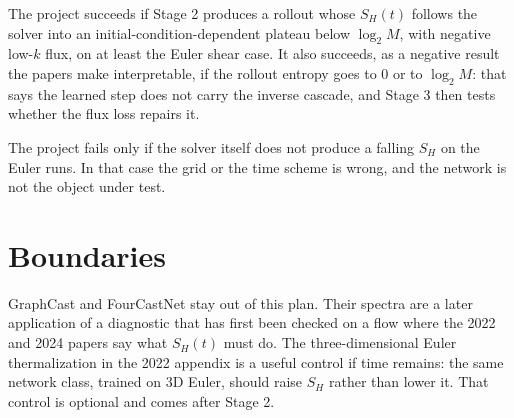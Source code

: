 \documentclass[11pt,a4paper]{article}
\begin{document}
The project succeeds if Stage 2 produces a rollout whose \(S_H(t)\) follows the solver into an initial-condition-dependent plateau below \(\log_2 M\), with negative low-\(k\) flux, on at least the Euler shear case.
It also succeeds, as a negative result the papers make interpretable, if the rollout entropy goes to \(0\) or to \(\log_2 M\): that says the learned step does not carry the inverse cascade, and Stage 3 then tests whether the flux loss repairs it.

The project fails only if the solver itself does not produce a falling \(S_H\) on the Euler runs.
In that case the grid or the time scheme is wrong, and the network is not the object under test.

\section{Boundaries}

GraphCast and FourCastNet stay out of this plan.
Their spectra are a later application of a diagnostic that has first been checked on a flow where the 2022 and 2024 papers say what \(S_H(t)\) must do.
The three-dimensional Euler thermalization in the 2022 appendix is a useful control if time remains: the same network class, trained on 3D Euler, should raise \(S_H\) rather than lower it.
That control is optional and comes after Stage 2.
\end{document}
